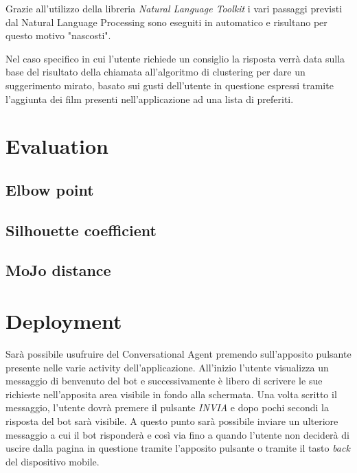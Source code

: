 \documentclass[a4paper, 10pt]{report}
\begin{document}
            Grazie all'utilizzo della libreria \textit{Natural Language Toolkit} i vari passaggi previsti dal Natural Language Processing
            sono eseguiti in automatico e risultano per questo motivo "nascosti".

            Nel caso specifico in cui l'utente richiede un consiglio la risposta verrà data sulla base del risultato della chiamata
            all'algoritmo di clustering per dare un suggerimento mirato, basato sui gusti dell'utente in questione espressi tramite
            l'aggiunta dei film presenti nell'applicazione ad una lista di preferiti.



    \chapter{Evaluation}\label{ch:evaluation}

        \section{Elbow point}\label{sec:elbow-point}


        \section{Silhouette coefficient}\label{sec:silhouette-coefficient}


        \section{MoJo distance}\label{sec:mojo-distance}


    \chapter{Deployment}\label{ch:deployment}

        Sarà possibile usufruire del Conversational Agent premendo sull'apposito pulsante presente nelle varie activity dell'applicazione.
        All'inizio l'utente visualizza un messaggio di benvenuto del bot e successivamente è libero di scrivere le sue
        richieste nell'apposita area visibile in fondo alla schermata. Una volta scritto il messaggio, l'utente dovrà premere il pulsante
        \textit{INVIA} e dopo pochi secondi la risposta del bot sarà visibile. A questo punto sarà possibile inviare un ulteriore messaggio a cui
        il bot risponderà e così via fino a quando l'utente non deciderà di uscire dalla pagina in questione tramite l'apposito pulsante
        o tramite il tasto \textit{back} del dispositivo mobile.
\end{document}
